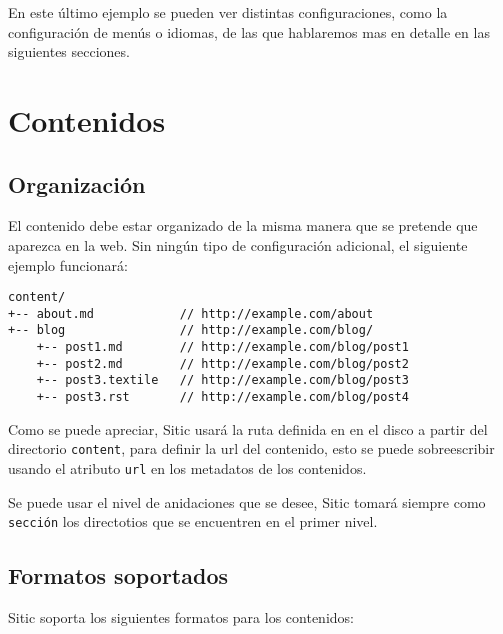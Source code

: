 En este último ejemplo se pueden ver distintas configuraciones, como la configuración de menús o
idiomas, de las que hablaremos mas en detalle en las siguientes secciones.



\section{Contenidos}

\subsection{Organización}

El contenido debe estar organizado de la misma manera que se pretende que aparezca en la web.
Sin ningún tipo de configuración adicional, el siguiente ejemplo funcionará:

\begin{verbatim}
content/
+-- about.md            // http://example.com/about
+-- blog                // http://example.com/blog/
    +-- post1.md        // http://example.com/blog/post1
    +-- post2.md        // http://example.com/blog/post2
    +-- post3.textile   // http://example.com/blog/post3
    +-- post3.rst       // http://example.com/blog/post4
\end{verbatim}

Como se puede apreciar, Sitic usará la ruta definida en en el disco a partir del directorio \texttt{content},
para definir la url del contenido, esto se puede sobreescribir usando el atributo \texttt{url} en los metadatos
de los contenidos.

Se puede usar el nivel de anidaciones que se desee, Sitic tomará siempre como \texttt{sección} los
directotios que se encuentren en el primer nivel.

\subsection{Formatos soportados}

Sitic soporta los siguientes formatos para los contenidos:

